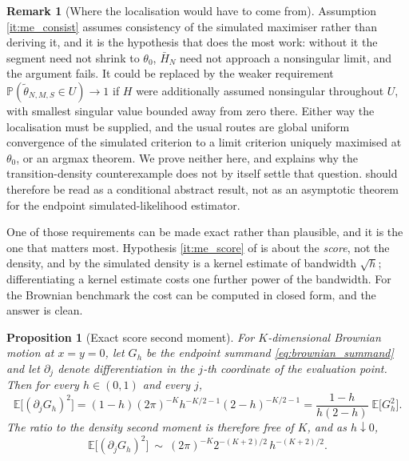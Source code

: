\documentclass[11pt]{article}
\newtheorem{proposition}[proposition]{Proposition}
\theoremstyle{definition}
\newtheorem{remark}[remark]{Remark}
\newcommand{\E}{\mathbb{E}}
\newcommand{\Pp}{\mathbb{P}}
\newcommand{\thetao}{\theta_0}
\begin{document}
\begin{remark}[Where the localisation would have to come from]\label{rem:me_localisation}
Assumption \ref{it:me_consist} assumes consistency of the simulated maximiser rather than deriving it, and it is the hypothesis that does the most work: without it the segment need not shrink to $\thetao$, $\bar H_N$ need not approach a nonsingular limit, and the argument fails. It could be replaced by the weaker requirement $\Pp(\widetilde\theta_{N,M,S}\in U)\to1$ if $H$ were additionally assumed nonsingular throughout $U$, with smallest singular value bounded away from zero there. Either way the localisation must be supplied, and the usual routes are global uniform convergence of the simulated criterion to a limit criterion uniquely maximised at $\thetao$, or an argmax theorem. We prove neither here, and  explains why the transition-density counterexample does not by itself settle that question.  should therefore be read as a conditional abstract result, not as an asymptotic theorem for the endpoint simulated-likelihood estimator.
\end{remark}

One of those requirements can be made exact rather than plausible, and it is the one that matters most. Hypothesis \ref{it:me_score} of  is about the \emph{score}, not the density, and by  the simulated density is a kernel estimate of bandwidth $\sqrt h$; differentiating a kernel estimate costs one further power of the bandwidth. For the Brownian benchmark the cost can be computed in closed form, and the answer is clean.

\begin{proposition}[Exact score second moment]\label{prop:score_moment}
For $K$-dimensional Brownian motion at $x=y=0$, let $G_h$ be the endpoint summand \eqref{eq:brownian_summand} and let $\partial_j$ denote differentiation in the $j$-th coordinate of the evaluation point. Then for every $h\in(0,1)$ and every $j$,
\begin{equation}\label{eq:score_second_moment}
\E\bigl[(\partial_jG_h)^2\bigr]
=(1-h)(2\pi)^{-K}h^{-K/2-1}(2-h)^{-K/2-1}
=\frac{1-h}{h(2-h)}\;\E\bigl[G_h^2\bigr].
\end{equation}
The ratio to the density second moment is therefore free of $K$, and as $h\downarrow0$,
\begin{equation}\label{eq:score_scale}
\E\bigl[(\partial_jG_h)^2\bigr]\ \sim\ (2\pi)^{-K}2^{-(K+2)/2}\,h^{-(K+2)/2}.
\end{equation}
\end{proposition}
\end{document}
